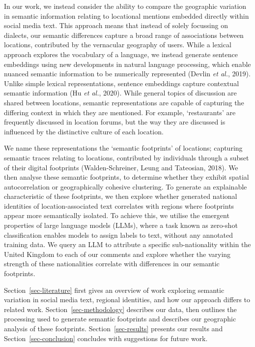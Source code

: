 \documentclass[
]{article}
\begin{document}
In our work, we instead consider the ability to compare the geographic
variation in semantic information relating to locational mentions
embedded directly within social media text. This approach means that
instead of solely focussing on dialects, our semantic differences
capture a broad range of associations between locations, contributed by
the vernacular geography of users. While a lexical approach explores the
vocabulary of a language, we instead generate sentence embeddings using
new developments in natural language processing, which enable nuanced
semantic information to be numerically represented (Devlin \emph{et
al.}, 2019). Unlike simple lexical representations, sentence embeddings
capture contextual semantic information (Hu \emph{et al.}, 2020). While
general topics of discussion are shared between locations, semantic
representations are capable of capturing the differing context in which
they are mentioned. For example, `restaurants' are frequently discussed
in location forums, but the way they are discussed is influenced by the
distinctive culture of each location.

We name these representations the `semantic footprints' of locations;
capturing semantic traces relating to locations, contributed by
individuals through a subset of their digital footprints
(Walden-Schreiner, Leung and Tateosian, 2018). We then analyse these
semantic footprints, to determine whether they exhibit spatial
autocorrelation or geographically cohesive clustering. To generate an
explainable characteristic of these footprints, we then explore whether
generated national identities of location-associated text correlates
with regions where footprints appear more semantically isolated. To
achieve this, we utilise the emergent properties of large language
models (LLMs), where a task known as zero-shot classification enables
models to assign labels to text, without any annotated training data. We
query an LLM to attribute a specific sub-nationality within the United
Kingdom to each of our comments and explore whether the varying strength
of these nationalities correlate with differences in our semantic
footprints.

Section~\ref{sec-literature} first gives an overview of work exploring
semantic variation in social media text, regional identities, and how
our approach differs to related work. Section~\ref{sec-methodology}
describes our data, then outlines the processing used to generate
semantic footprints and describes our geographic analysis of these
footprints. Section~\ref{sec-results} presents our results and
Section~\ref{sec-conclusion} concludes with suggestions for future work.
\end{document}
